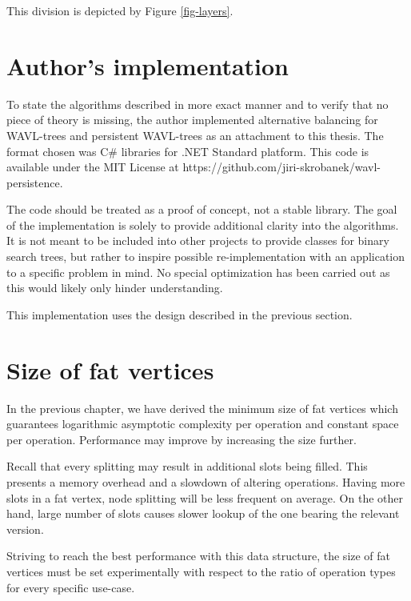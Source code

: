This division is depicted by Figure \ref{fig-layers}.



\section{Author's implementation}

To state the algorithms described in more exact manner and to verify that no piece of theory is missing, the author implemented alternative balancing for WAVL-trees and persistent WAVL-trees as an attachment to this thesis. 
The format chosen was C\# libraries for .NET Standard platform. 
This code is available under the MIT License at\linebreak
{\ttfamily https://github.com/jiri-skrobanek/wavl-persistence}.

The code should be treated as a proof of concept, not a stable library. The goal of the implementation is solely to provide additional clarity into the algorithms. 
It is not meant to be included into other projects to provide classes for binary search trees, but rather to inspire possible re-implementation with an application to a specific problem in mind.
No special optimization has been carried out as this would likely only hinder understanding. 

This implementation uses the design described in the previous section.

\section{Size of fat vertices}

In the previous chapter, we have derived the minimum size of fat vertices which guarantees logarithmic asymptotic complexity per operation and constant space per operation. 
Performance may improve by increasing the size further.

Recall that every splitting may result in additional slots being filled. 
This presents a memory overhead and a slowdown of altering operations. 
Having more slots in a fat vertex, node splitting will be less frequent on average. 
On the other hand, large number of slots causes slower lookup of the one bearing the relevant version. 

Striving to reach the best performance with this data structure, the size of fat vertices must be set experimentally with respect to the ratio of operation types for every specific use-case.